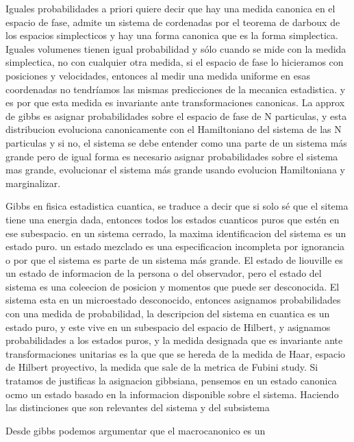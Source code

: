 Iguales probabilidades a priori quiere decir que hay una medida canonica en el espacio de fase, admite un sistema de cordenadas por el teorema de darboux de los espacios simplecticos y hay una forma canonica que es la forma simplectica. Iguales volumenes tienen igual probabilidad y sólo cuando se mide con la medida simplectica, no con cualquier otra medida, si el espacio de fase lo hicieramos con posiciones y velocidades, entonces al medir una medida uniforme en esas coordenadas no tendríamos las mismas predicciones de la mecanica estadistica. y es por que esta medida es invariante ante transformaciones canonicas. La approx de gibbs es asignar probabilidades sobre el espacio de fase de N particulas, y esta distribucion evoluciona canonicamente con el Hamiltoniano del sistema de las N particulas y si no, el sistema se debe entender como una parte de un sistema más grande pero de igual forma es necesario asignar probabilidades sobre el sistema mas grande, evolucionar el sistema más grande usando evolucion Hamiltoniana y marginalizar. 


Gibbs en fisica estadistica cuantica, se traduce a decir que si solo sé que el sitema tiene una energia dada, entonces todos los estados cuanticos puros que estén en ese subespacio.
en un sistema cerrado, la maxima identificacion del sistema es un estado puro. un estado mezclado es una especificacion incompleta por ignorancia o por que el sistema es parte de un sistema más grande. El estado de liouville es un estado de informacion de la persona o del observador, pero el estado del sistema es una coleecion de posicion y momentos que puede ser desconocida.
El sistema esta en un microestado desconocido, entonces asignamos probabilidades con una medida de probabilidad, la descripcion del sistema en cuantica es un estado puro, y este vive en un subespacio del espacio de Hilbert, y asignamos probabilidades a los estados puros, y la medida designada que es invariante ante transformaciones unitarias es la que que se hereda de la medida de Haar, espacio de Hilbert proyectivo, la medida que sale de la metrica de Fubini study. Si tratamos de justificas la asignacion gibbsiana, pensemos en un estado canonica ocmo un estado basado en la informacion disponible sobre el sistema. Haciendo las distinciones que son relevantes del sistema y del subsistema

Desde gibbs podemos argumentar que el macrocanonico es un 

